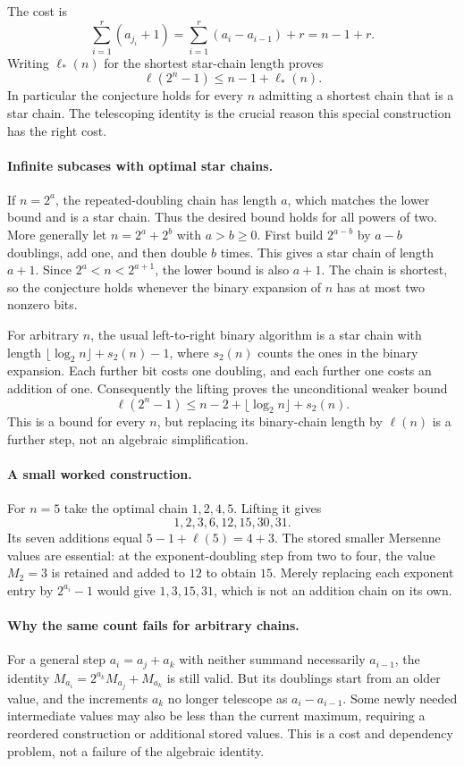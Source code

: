 \documentclass[11pt,a4paper]{article}
\begin{document}
The cost is
\[
 \sum_{i=1}^r(a_{j_i}+1)
  =\sum_{i=1}^r(a_i-a_{i-1})+r=n-1+r.
\]
Writing $\ell_*(n)$ for the shortest star-chain length proves
\[
                  \ell(2^n-1)\le n-1+\ell_*(n).
\]
In particular the conjecture holds for every $n$ admitting a shortest
chain that is a star chain. The telescoping identity is the crucial
reason this special construction has the right cost.

\paragraph{Infinite subcases with optimal star chains.}
If $n=2^a$, the repeated-doubling chain has length $a$, which matches
the lower bound and is a star chain. Thus the desired bound holds for
all powers of two. More generally let
$n=2^a+2^b$ with $a>b\ge0$. First build $2^{a-b}$ by $a-b$
doublings, add one, and then double $b$ times. This gives a star chain
of length $a+1$. Since $2^a<n<2^{a+1}$, the lower bound is also
$a+1$. The chain is shortest, so the conjecture holds whenever the
binary expansion of $n$ has at most two nonzero bits.

For arbitrary $n$, the usual left-to-right binary algorithm is a star
chain with length $\lfloor\log_2n\rfloor+s_2(n)-1$, where $s_2(n)$
counts the ones in the binary expansion. Each further bit costs one
doubling, and each further one costs an addition of one. Consequently
the lifting proves the unconditional weaker bound
\[
 \ell(2^n-1)\le n-2+\lfloor\log_2n\rfloor+s_2(n).
\]
This is a bound for every $n$, but replacing its binary-chain length by
$\ell(n)$ is a further step, not an algebraic simplification.

\paragraph{A small worked construction.}
For $n=5$ take the optimal chain $1,2,4,5$. Lifting it gives
\[
                  1,2,3,6,12,15,30,31.
\]
Its seven additions equal $5-1+\ell(5)=4+3$. The stored smaller
Mersenne values are essential: at the exponent-doubling step from two
to four, the value $M_2=3$ is retained and added to $12$ to obtain
$15$. Merely replacing each exponent entry by $2^{a_i}-1$ would give
$1,3,15,31$, which is not an addition chain on its own.

\paragraph{Why the same count fails for arbitrary chains.}
For a general step $a_i=a_j+a_k$ with neither summand necessarily
$a_{i-1}$, the identity
$M_{a_i}=2^{a_k}M_{a_j}+M_{a_k}$ is still valid. But its doublings
start from an older value, and the increments $a_k$ no longer telescope
as $a_i-a_{i-1}$. Some newly needed intermediate values may also be
less than the current maximum, requiring a reordered construction or
additional stored values. This is a cost and dependency problem, not
a failure of the algebraic identity.
\end{document}
